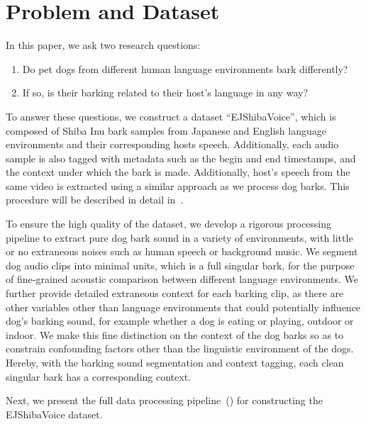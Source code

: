\section{Problem and Dataset}
\label{sec:assumption}
In this paper, we ask two research questions: 
\begin{enumerate}
\item Do pet dogs from different human language environments bark differently? 
\item If so, is their barking related to their host's language in any way? 
\end{enumerate}

To answer these questions, we construct a dataset ``EJShibaVoice'', 
which is composed of Shiba Inu bark samples from Japanese and English language environments 
and their corresponding hosts speech. Additionally, each audio sample is also tagged with
metadata such as the begin and end timestamps, and the context under which the bark is made.    
Additionally, host's speech from the same video is extracted using a similar approach as we process dog barks. This procedure will be described in detail in~.

To ensure the high quality of the dataset, we develop a rigorous processing pipeline to extract pure dog bark sound in a variety of environments, with little or no extraneous noises such as human speech or background music. We segment dog audio clips into minimal units, which is a full singular bark, for the purpose of fine-grained acoustic comparison between different language environments. 
We further provide detailed extraneous context for each barking clip, as there are other variables other than language environments that could potentially influence dog's barking sound, for example whether a dog is eating or playing, outdoor or indoor\cite{larranaga2015comparing, molnar2008classification}. We make this fine distinction on the context of the dog barks so as to constrain confounding factors other than the linguistic environment of the dogs. Hereby, with the barking sound segmentation and context tagging, each clean singular bark has a corresponding context.


Next, we present the full data processing pipeline~() 
for constructing the EJShibaVoice dataset. 

